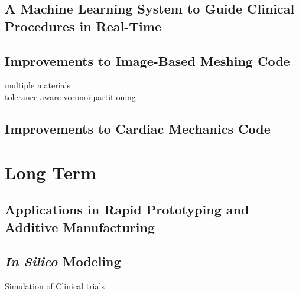 \subsection[A Machine Learning System to Guide Clinical Procedures in \newline Real-Time]{\texorpdfstring{A Machine Learning System to Guide Clinical \newline Procedures in Real-Time}{A Machine Learning System to Guide Clinical \newline Procedures in Real-Time}}
\label{A Machine Learning System to Guide Clinical Procedures in Real-Time}

\subsection{Improvements to Image-Based Meshing Code}
\label{Improvements to Image-Based Meshing Code}
multiple materials \\
tolerance-aware voronoi partitioning \\

\subsection{Improvements to Cardiac Mechanics Code}
\label{Improvements to Cardiac Mechanics Code}

\section{Long Term}
\label{Long Term}

\subsection[Applications in Rapid Prototyping and Additive Manufacturing]{\texorpdfstring{Applications in Rapid Prototyping and Additive \newline Manufacturing}{Applications in Rapid Prototyping and Additive \newline Manufacturing}}
\label{Applications in Rapid Prototyping and Additive Manufacturing}

\subsection{\textit{In Silico} Modeling}
\label{In Silico Modeling}
Simulation of Clinical trials


